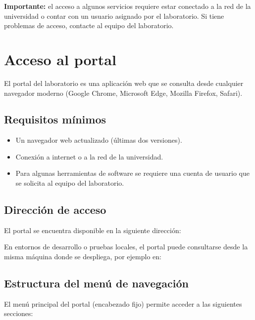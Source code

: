 \documentclass[12pt,a4paper]{report}
\begin{document}
\begin{mdframed}[style=importantstyle]
  \textbf{Importante:} el acceso a algunos servicios requiere estar conectado a
  la red de la universidad o contar con un usuario asignado por el laboratorio.
  Si tiene problemas de acceso, contacte al equipo del laboratorio.
\end{mdframed}

\chapter{Acceso al portal}

El portal del laboratorio es una aplicación web que se consulta desde cualquier
navegador moderno (Google Chrome, Microsoft Edge, Mozilla Firefox, Safari).

\section{Requisitos mínimos}

\begin{itemize}
  \item Un navegador web actualizado (últimas dos versiones).
  \item Conexión a internet o a la red de la universidad.
  \item Para algunas herramientas de software se requiere una cuenta de
        usuario que se solicita al equipo del laboratorio.
\end{itemize}

\section{Dirección de acceso}

El portal se encuentra disponible en la siguiente dirección:


En entornos de desarrollo o pruebas locales, el portal puede consultarse
desde la misma máquina donde se despliega, por ejemplo en:


\section{Estructura del menú de navegación}

El menú principal del portal (encabezado fijo) permite acceder a las siguientes
secciones:
\end{document}
